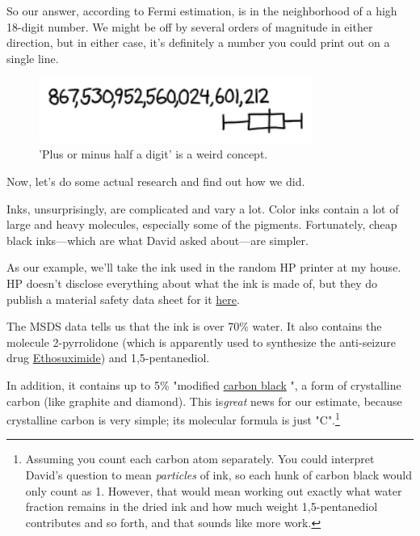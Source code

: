 {{So our answer, according to Fermi estimation, is in the neighborhood of a high 18-digit number. We might be off by several orders of magnitude in either direction, but in either case, it's definitely a number you could print out on a single line.}

\begin{figure}[!htbp]
\centering
\includegraphics[scale=0.5, max width=0.8\textwidth]{imgs/a/106/number.png}
\caption{'Plus or minus half a digit' is a weird concept.}
\end{figure}

{Now, let's do some actual research and find out how we did.}

{Inks, unsurprisingly, are complicated and vary a lot. Color inks contain a lot of large and heavy molecules, especially some of the pigments. Fortunately, cheap black inks—which are what David asked about—are simpler.}

{As our example, we'll take the ink used in the random HP printer at my house. HP doesn't disclose everything about what the ink is made of, but they do publish a material safety data sheet for it \href{http://www.hp.com/hpinfo/globalcitizenship/environment/productdata/Countries/us/ij\_b3b11series\_us\_eng\_v28.pdf}{here}.}

{The MSDS data tells us that the ink is over 70\% water. It also contains the molecule 2-pyrrolidone (which is apparently used to synthesize the anti-seizure drug \href{https://en.wikipedia.org/wiki/Ethosuximide}{Ethosuximide}) and 1,5-pentanediol.}

{In addition, it contains up to 5\% "modified \href{https://en.wikipedia.org/wiki/Carbon\_black}{carbon black} ", a form of crystalline carbon (like graphite and diamond). This is\emph{great} news for our estimate, because crystalline carbon is very simple; its molecular formula is just "C".{\footnote{Assuming you count each carbon atom separately. You could interpret David's question to mean \emph{particles} of ink, so each hunk of carbon black would only count as 1. However, that would mean working out exactly what water fraction remains in the dried ink and how much weight 1,5-pentanediol contributes and so forth, and that sounds like more work.} } }

}
